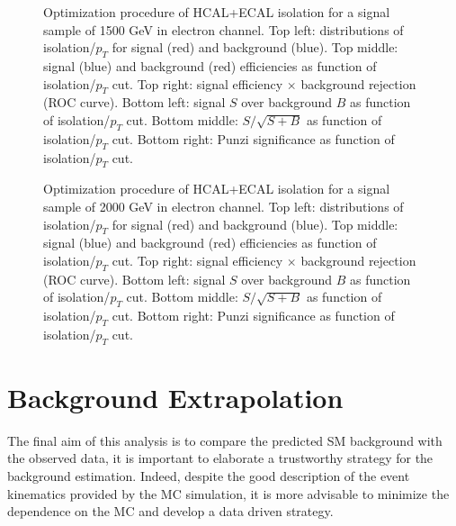 \documentclass[12pt]{article} %
\begin{document}
\begin{figure}[H] %
  \caption{Optimization procedure of HCAL+ECAL isolation for a signal sample of 1500 GeV in electron channel. Top left: distributions of isolation/$p_T$ for signal (red) and background (blue). Top middle: signal (blue) and background (red) efficiencies as function of isolation/$p_T$ cut. Top right: signal efficiency $\times$ background rejection (ROC curve). Bottom left: signal $S$ over background $B$ as function of isolation/$p_T$ cut. Bottom middle: $S/\sqrt{S + B}$ as function of isolation/$p_T$ cut. Bottom right: Punzi significance as function of isolation/$p_T$ cut.}
  \label{fig:elecal1500}
\end{figure}

\begin{figure}[H] %
  \caption{Optimization procedure of HCAL+ECAL isolation for a signal sample of 2000 GeV in electron channel. Top left: distributions of isolation/$p_T$ for signal (red) and background (blue). Top middle: signal (blue) and background (red) efficiencies as function of isolation/$p_T$ cut. Top right: signal efficiency $\times$ background rejection (ROC curve). Bottom left: signal $S$ over background $B$ as function of isolation/$p_T$ cut. Bottom middle: $S/\sqrt{S + B}$ as function of isolation/$p_T$ cut. Bottom right: Punzi significance as function of isolation/$p_T$ cut.}
  \label{fig:elecal2000}
\end{figure}


\newpage



\section{Background Extrapolation} %

The final aim of this analysis is to compare the predicted SM background with the observed data, it is important to elaborate a trustworthy strategy for the background estimation. Indeed, despite the good description of the event kinematics provided by the MC simulation, it is more advisable to minimize the dependence on the MC and develop a data driven strategy. 
\end{document}
